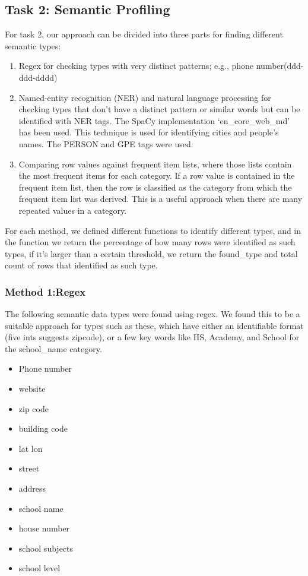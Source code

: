 \documentclass[sigconf,authordraft]{acmart}
\begin{document}
\subsection{Task 2: Semantic Profiling}
For task 2, our approach can be divided into three parts for finding different semantic types:
\begin{enumerate}
    \item Regex for checking types with very distinct patterns; e.g., phone number(ddd-ddd-dddd) 
    \item Named-entity recognition (NER) and natural language processing for checking types that don’t have a distinct pattern or similar words but can be identified with NER tags. The SpaCy implementation ‘en\_core\_web\_md’ has been used. This technique is used for
    identifying cities and people’s names. The PERSON and GPE tags were used.
    \item Comparing row values against frequent item lists, where those lists contain the most
frequent items for each category. If a row value is contained in the frequent item list, then
the row is classified as the category from which the frequent item list was derived. This is
a useful approach when there are many repeated values in a category.
\end{enumerate}
For each method, we defined different functions to identify different types, and in the function we
return the percentage of how many rows were identified as such types, if it’s larger than a certain
threshold, we return the found\_type and total count of rows that identified as such type.


\subsubsection{Method 1:Regex}

The following semantic data types were found using regex. We found this to be a suitable approach for types such as these, which have either an identifiable format (five ints suggests zipcode), or a few key words like HS, Academy, and School for the school\_name category.
\begin{itemize}
    \item Phone number
    \item website
    \item zip code
    \item building code
    \item lat lon
    \item street
    \item address
    \item school name
    \item house number
    \item school subjects
    \item school level
\end{itemize}
\end{document}
